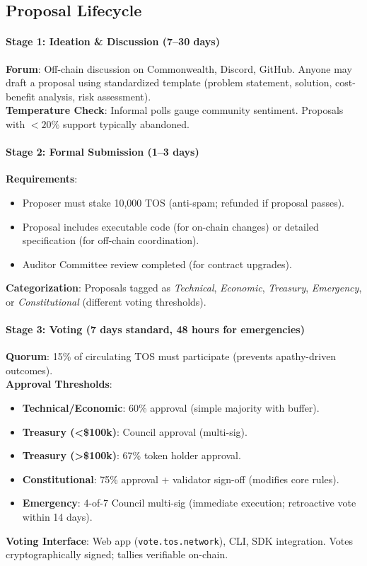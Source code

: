 \documentclass[11pt]{article}
\begin{document}
\subsection{Proposal Lifecycle}

\paragraph{Stage 1: Ideation \& Discussion (7--30 days)}
\textbf{Forum}: Off-chain discussion on Commonwealth, Discord, GitHub. Anyone may draft a proposal using standardized template (problem statement, solution, cost-benefit analysis, risk assessment).\\
\textbf{Temperature Check}: Informal polls gauge community sentiment. Proposals with $<20\%$ support typically abandoned.

\paragraph{Stage 2: Formal Submission (1--3 days)}
\textbf{Requirements}:
\begin{itemize}[noitemsep]
  \item Proposer must stake 10,000 TOS (anti-spam; refunded if proposal passes).
  \item Proposal includes executable code (for on-chain changes) or detailed specification (for off-chain coordination).
  \item Auditor Committee review completed (for contract upgrades).
\end{itemize}
\textbf{Categorization}: Proposals tagged as \emph{Technical}, \emph{Economic}, \emph{Treasury}, \emph{Emergency}, or \emph{Constitutional} (different voting thresholds).

\paragraph{Stage 3: Voting (7 days standard, 48 hours for emergencies)}
\textbf{Quorum}: 15\% of circulating TOS must participate (prevents apathy-driven outcomes).\\
\textbf{Approval Thresholds}:
\begin{itemize}[noitemsep]
  \item \textbf{Technical/Economic}: 60\% approval (simple majority with buffer).
  \item \textbf{Treasury (<\$100k)}: Council approval (multi-sig).
  \item \textbf{Treasury (>\$100k)}: 67\% token holder approval.
  \item \textbf{Constitutional}: 75\% approval + validator sign-off (modifies core rules).
  \item \textbf{Emergency}: 4-of-7 Council multi-sig (immediate execution; retroactive vote within 14 days).
\end{itemize}
\textbf{Voting Interface}: Web app (\texttt{vote.tos.network}), CLI, SDK integration. Votes cryptographically signed; tallies verifiable on-chain.
\end{document}
